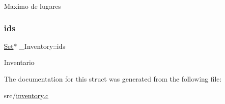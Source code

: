 Maximo de lugares \mbox{\label{struct__Inventory_a7f6b5d7d1111e7e8f8999c656ae27d0c}} 
\subsubsection{\texorpdfstring{ids}{ids}}
{\footnotesize\ttfamily \hyperlink{struct__Set}{Set}$\ast$ \+\_\+\+Inventory\+::ids}

Inventario 

The documentation for this struct was generated from the following file\+:\begin{DoxyCompactItemize}
\item 
src/\hyperlink{inventory_8c}{inventory.\+c}\end{DoxyCompactItemize}
